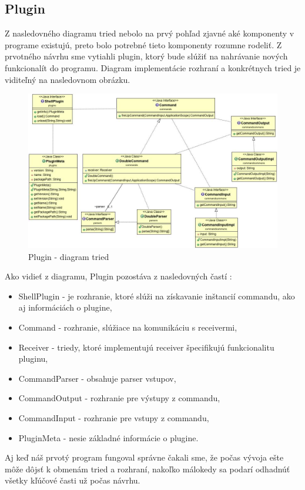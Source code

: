 \subsection{Plugin}
\indent Z nasledovného diagramu tried nebolo na prvý pohľad zjavné aké komponenty v programe existujú, preto bolo potrebné tieto komponenty rozumne rodeliť. Z prvotného návrhu sme vytiahli plugin, ktorý bude slúžiť na nahrávanie nových funkcionalít do programu.  Diagram implementácie rozhraní a konkrétnych tried  je viditeľný na nasledovnom obrázku. 
\newpage
 \begin{figure}[!htbp]
	\centering
	\includegraphics[width=\linewidth]{img/plugin_class.jpg}
	\caption{Plugin - diagram tried}
	\label{fig:test}
\end{figure}
\newline
\indent Ako vidieť z diagramu, Plugin pozostáva z nasledovných častí :
\begin{itemize}
	\item ShellPlugin - je rozhranie, ktoré slúži na získavanie inštancií commandu, ako aj informáciách o plugine, 
	\item Command - rozhranie, slúžiace na komunikáciu s receivermi,
	\item Receiver - triedy, ktoré implementujú receiver špecifikujú funkcionalitu pluginu,
	\item CommandParser - obsahuje parser vstupov,
	\item CommandOutput - rozhranie pre výstupy z commandu,
	\item CommandInput - rozhranie pre vstupy z commandu,
	\item  PluginMeta - nesie základné informácie o plugine.
\end{itemize}
Aj keď náš prvotý program fungoval správne čakali sme, že počas vývoja ešte môže dôjsť k obmenám tried a rozhraní, nakoľko málokedy sa podarí odhadnúť  všetky kľúčové časti už počas návrhu.

